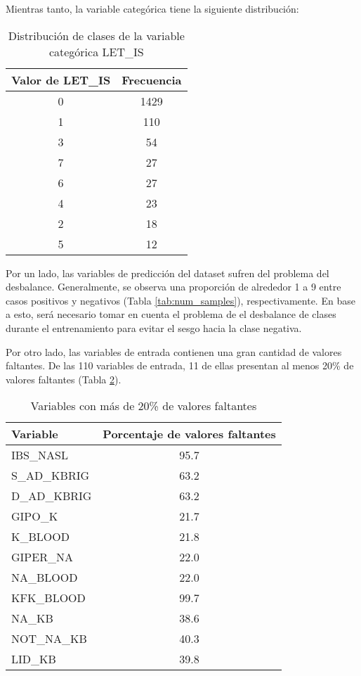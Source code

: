 \documentclass[conference]{IEEEtran}
\begin{document}
Mientras tanto, la variable categórica tiene la siguiente distribución:

\begin{table}[ht]
\centering
\caption{Distribución de clases de la variable categórica LET\_IS}
\begin{tabular}{c|c}

\textbf{Valor de LET\_IS} & \textbf{Frecuencia} \\
\hline
    \rule{0pt}{3ex}
    0 & 1429 \\
    1 & 110 \\
    3 & 54 \\
    7 & 27 \\
    6 & 27 \\
    4 & 23 \\
    2 & 18 \\
    5 & 12 \\

\end{tabular}
\label{tab:let_is_dist}
\end{table}

Por un lado, las variables de predicción del dataset sufren del problema del desbalance. Generalmente, se observa una proporción de alrededor 1 a 9 entre casos positivos y negativos (Tabla \ref{tab:num_samples}), respectivamente. En base a esto, será necesario tomar en cuenta el problema de el desbalance de clases durante el entrenamiento para evitar el sesgo hacia la clase negativa. 

Por otro lado, las variables de entrada contienen una gran cantidad de valores faltantes. De las 110 variables de entrada, 11 de ellas presentan al menos 20\% de valores faltantes (Tabla \ref{above_20_misssing_values_from_input}).

\begin{table}[ht!]
\centering
\caption{Variables con más de 20\% de valores faltantes}
    \begin{tabular}{l|c}
    \textbf{Variable} & \textbf{Porcentaje de valores faltantes} \\
    \hline
    \rule{0pt}{3ex}
    IBS\_NASL     & 95.7 \\
    S\_AD\_KBRIG   & 63.2 \\
    D\_AD\_KBRIG   & 63.2 \\
    GIPO\_K       & 21.7 \\
    K\_BLOOD      & 21.8 \\
    GIPER\_NA     & 22.0 \\
    NA\_BLOOD     & 22.0 \\
    KFK\_BLOOD    & 99.7 \\
    NA\_KB        & 38.6 \\ 
    NOT\_NA\_KB    & 40.3 \\
    LID\_KB       & 39.8 \\
    \end{tabular}
\label{above_20_misssing_values_from_input}
\end{table}
\end{document}
